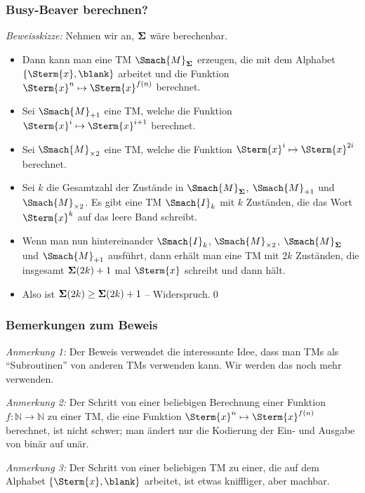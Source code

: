 \documentclass[onlymath]{beamer}
\begin{document}
\begin{frame}\frametitle{Busy-Beaver berechnen?}



\pause
\emph{Beweisskizze:} Nehmen wir an, $\boldsymbol{\Sigma}$ wäre berechenbar.\pause
\begin{itemize}
\item Dann kann man eine TM $\Smach{M}_{\bbfunc}$ erzeugen, die mit dem Alphabet $\{\Sterm{x},\blank\}$ arbeitet und die Funktion $\Sterm{x}^n\mapsto\Sterm{x}^{f(n)}$ berechnet.\pause
\item Sei $\Smach{M}_{+1}$ eine TM, welche die Funktion $\Sterm{x}^i\mapsto\Sterm{x}^{i+1}$ berechnet.\pause
\item Sei $\Smach{M}_{\times2}$ eine TM, welche die Funktion $\Sterm{x}^i\mapsto\Sterm{x}^{2i}$ berechnet.\pause
\item Sei $k$ die Gesamtzahl der Zustände in $\Smach{M}_{\bbfunc}$, $\Smach{M}_{+1}$ und $\Smach{M}_{\times2}$. Es gibt eine TM $\Smach{I}_k$ mit $k$ Zuständen, die das Wort $\Sterm{x}^k$ auf das leere Band schreibt.\pause
\item Wenn man nun hintereinander $\Smach{I}_k$, $\Smach{M}_{\times2}$, $\Smach{M}_{\bbfunc}$ und $\Smach{M}_{+1}$ ausführt, dann erhält man eine TM mit $2k$ Zuständen, die insgesamt $\boldsymbol{\Sigma}(2k)+1$ mal $\Sterm{x}$ schreibt und dann hält.\pause
\item Also ist $\boldsymbol{\Sigma}(2k)\geq\boldsymbol{\Sigma}(2k)+1$ -- Widerspruch.\qed
\end{itemize}


\end{frame}

\begin{frame}\frametitle{Bemerkungen zum Beweis}

\emph{Anmerkung 1:} Der Beweis verwendet die interessante Idee, dass man TMs als "`Subroutinen"' von anderen TMs verwenden kann. Wir werden das noch mehr verwenden.
\bigskip

\emph{Anmerkung 2:} Der Schritt von einer beliebigen Berechnung einer Funktion $f:\mathbb{N}\to\mathbb{N}$ zu einer TM, die eine Funktion $\Sterm{x}^n\mapsto \Sterm{x}^{f(n)}$ berechnet, ist nicht schwer; man ändert nur die Kodierung der Ein- und Ausgabe von binär auf unär.
\bigskip

\emph{Anmerkung 3:} Der Schritt von einer beliebigen TM zu einer, die auf dem Alphabet $\{\Sterm{x},\blank\}$ arbeitet, ist etwas kniffliger, aber machbar.

\end{frame}
\end{document}
